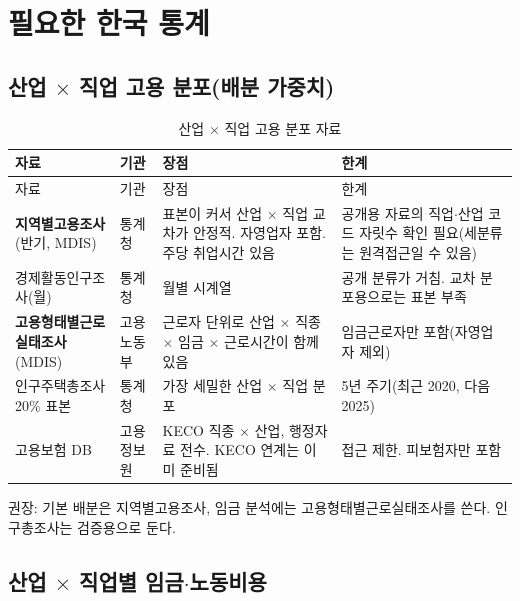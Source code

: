 \documentclass[11pt]{article}
\begin{document}
\section{필요한 한국 통계}

\subsection{산업 $\times$ 직업 고용 분포(배분 가중치)}

\begin{longtable}{L{3.6cm}L{1.9cm}L{5.2cm}L{5.3cm}}
\caption{산업 $\times$ 직업 고용 분포 자료}\label{tab:emp}\\
\toprule
자료 & 기관 & 장점 & 한계 \\
\midrule
\endfirsthead
\toprule
자료 & 기관 & 장점 & 한계 \\
\midrule
\endhead
\textbf{지역별고용조사}(반기, MDIS) & 통계청 & 표본이 커서 산업 $\times$ 직업 교차가 안정적. 자영업자 포함. 주당 취업시간 있음 & 공개용 자료의 직업$\cdot$산업 코드 자릿수 확인 필요(세분류는 원격접근일 수 있음) \\
경제활동인구조사(월) & 통계청 & 월별 시계열 & 공개 분류가 거침. 교차 분포용으로는 표본 부족 \\
\textbf{고용형태별근로실태조사}(MDIS) & 고용노동부 & 근로자 단위로 산업 $\times$ 직종 $\times$ 임금 $\times$ 근로시간이 함께 있음 & 임금근로자만 포함(자영업자 제외) \\
인구주택총조사 20\% 표본 & 통계청 & 가장 세밀한 산업 $\times$ 직업 분포 & 5년 주기(최근 2020, 다음 2025) \\
고용보험 DB & 고용정보원 & KECO 직종 $\times$ 산업, 행정자료 전수. KECO 연계는 이미 준비됨 & 접근 제한. 피보험자만 포함 \\
\bottomrule
\end{longtable}

\noindent 권장: 기본 배분은 지역별고용조사, 임금 분석에는 고용형태별근로실태조사를 쓴다. 인구총조사는 검증용으로 둔다.

\subsection{산업 $\times$ 직업별 임금$\cdot$노동비용}
\end{document}

